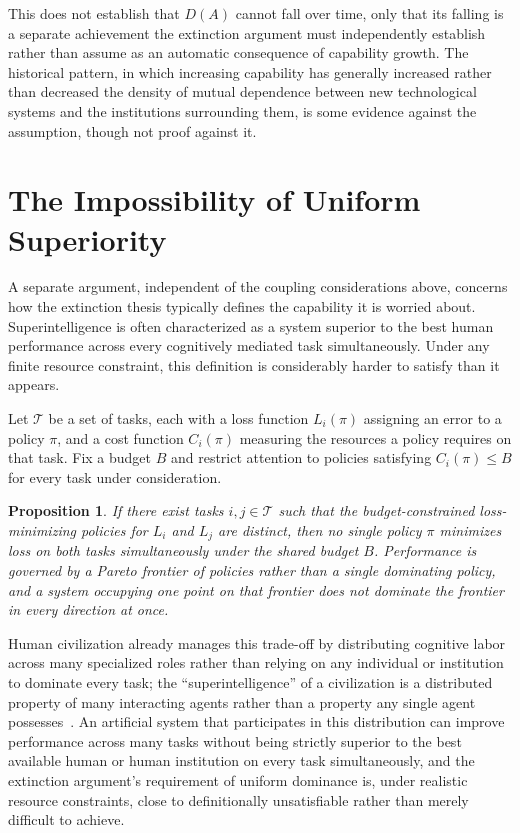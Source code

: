 \documentclass[11pt]{article}
\newtheorem{proposition}{Proposition}
\begin{document}
This does not establish that $D(A)$ cannot fall over time, only that its falling is a separate achievement the extinction argument must independently establish rather than assume as an automatic consequence of capability growth. The historical pattern, in which increasing capability has generally increased rather than decreased the density of mutual dependence between new technological systems and the institutions surrounding them, is some evidence against the assumption, though not proof against it.

\section{The Impossibility of Uniform Superiority}

A separate argument, independent of the coupling considerations above, concerns how the extinction thesis typically defines the capability it is worried about. Superintelligence is often characterized as a system superior to the best human performance across every cognitively mediated task simultaneously. Under any finite resource constraint, this definition is considerably harder to satisfy than it appears.

Let $\mathcal{T}$ be a set of tasks, each with a loss function $L_i(\pi)$ assigning an error to a policy $\pi$, and a cost function $C_i(\pi)$ measuring the resources a policy requires on that task. Fix a budget $B$ and restrict attention to policies satisfying $C_i(\pi) \le B$ for every task under consideration.

\begin{proposition}
If there exist tasks $i, j \in \mathcal{T}$ such that the budget-constrained loss-minimizing policies for $L_i$ and $L_j$ are distinct, then no single policy $\pi$ minimizes loss on both tasks simultaneously under the shared budget $B$. Performance is governed by a Pareto frontier of policies rather than a single dominating policy, and a system occupying one point on that frontier does not dominate the frontier in every direction at once.
\end{proposition}

Human civilization already manages this trade-off by distributing cognitive labor across many specialized roles rather than relying on any individual or institution to dominate every task; the “superintelligence” of a civilization is a distributed property of many interacting agents rather than a property any single agent possesses~\cite{russellnorvig}. An artificial system that participates in this distribution can improve performance across many tasks without being strictly superior to the best available human or human institution on every task simultaneously, and the extinction argument's requirement of uniform dominance is, under realistic resource constraints, close to definitionally unsatisfiable rather than merely difficult to achieve.
\end{document}
